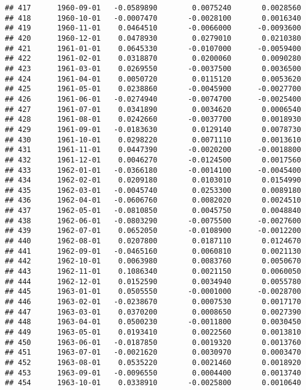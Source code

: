 \documentclass[
]{article}
\begin{document}
\begin{verbatim}
## 417      1960-09-01   -0.0589890        0.0075240       0.0028560
## 418      1960-10-01   -0.0007470       -0.0028100       0.0016340
## 419      1960-11-01    0.0464510       -0.0066000      -0.0093600
## 420      1960-12-01    0.0478930        0.0279010       0.0210380
## 421      1961-01-01    0.0645330       -0.0107000      -0.0059400
## 422      1961-02-01    0.0318870        0.0200060       0.0090280
## 423      1961-03-01    0.0269550       -0.0037500       0.0036500
## 424      1961-04-01    0.0050720        0.0115120       0.0053620
## 425      1961-05-01    0.0238860       -0.0045900      -0.0027700
## 426      1961-06-01   -0.0274940       -0.0074700      -0.0025400
## 427      1961-07-01    0.0341890        0.0034620       0.0006540
## 428      1961-08-01    0.0242660       -0.0037700       0.0018930
## 429      1961-09-01   -0.0183630        0.0129140       0.0078730
## 430      1961-10-01    0.0298220        0.0071110       0.0013610
## 431      1961-11-01    0.0447390       -0.0020200      -0.0018800
## 432      1961-12-01    0.0046270       -0.0124500       0.0017560
## 433      1962-01-01   -0.0366180       -0.0014100      -0.0045400
## 434      1962-02-01    0.0209180        0.0103010       0.0154990
## 435      1962-03-01   -0.0045740        0.0253300       0.0089180
## 436      1962-04-01   -0.0606760        0.0082020       0.0024510
## 437      1962-05-01   -0.0810850        0.0045750       0.0048840
## 438      1962-06-01   -0.0803290       -0.0075500      -0.0027600
## 439      1962-07-01    0.0652050       -0.0108900      -0.0012200
## 440      1962-08-01    0.0207800        0.0187110       0.0124670
## 441      1962-09-01   -0.0465160        0.0060810       0.0021130
## 442      1962-10-01    0.0063980        0.0083760       0.0050670
## 443      1962-11-01    0.1086340        0.0021150       0.0060050
## 444      1962-12-01    0.0152590        0.0034940       0.0055780
## 445      1963-01-01    0.0505550       -0.0001000      -0.0028700
## 446      1963-02-01   -0.0238670        0.0007530       0.0017170
## 447      1963-03-01    0.0370200        0.0008650       0.0027390
## 448      1963-04-01    0.0500230       -0.0011800       0.0030450
## 449      1963-05-01    0.0193410        0.0022560       0.0013810
## 450      1963-06-01   -0.0187850        0.0019320       0.0013760
## 451      1963-07-01   -0.0021620        0.0030970       0.0003470
## 452      1963-08-01    0.0535220        0.0021460       0.0018920
## 453      1963-09-01   -0.0096550        0.0004400       0.0013740
## 454      1963-10-01    0.0338910       -0.0025800       0.0010640

\end{verbatim}
\end{document}
